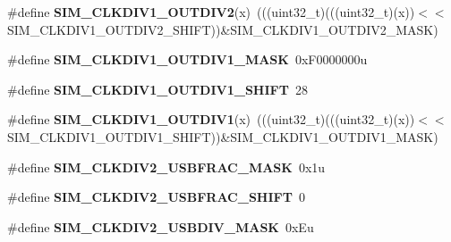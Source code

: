 \begin{DoxyCompactItemize}
\item 
\#define {\bfseries S\+I\+M\+\_\+\+C\+L\+K\+D\+I\+V1\+\_\+\+O\+U\+T\+D\+I\+V2}(x)~(((uint32\+\_\+t)(((uint32\+\_\+t)(x))$<$$<$S\+I\+M\+\_\+\+C\+L\+K\+D\+I\+V1\+\_\+\+O\+U\+T\+D\+I\+V2\+\_\+\+S\+H\+I\+FT))\&S\+I\+M\+\_\+\+C\+L\+K\+D\+I\+V1\+\_\+\+O\+U\+T\+D\+I\+V2\+\_\+\+M\+A\+SK)\hypertarget{group__SIM__Register__Masks_gacf3906094a4539818d91cfda55ae2141}{}\label{group__SIM__Register__Masks_gacf3906094a4539818d91cfda55ae2141}

\item 
\#define {\bfseries S\+I\+M\+\_\+\+C\+L\+K\+D\+I\+V1\+\_\+\+O\+U\+T\+D\+I\+V1\+\_\+\+M\+A\+SK}~0x\+F0000000u\hypertarget{group__SIM__Register__Masks_ga1bd42e75000e91999a7d8c2f94a9b606}{}\label{group__SIM__Register__Masks_ga1bd42e75000e91999a7d8c2f94a9b606}

\item 
\#define {\bfseries S\+I\+M\+\_\+\+C\+L\+K\+D\+I\+V1\+\_\+\+O\+U\+T\+D\+I\+V1\+\_\+\+S\+H\+I\+FT}~28\hypertarget{group__SIM__Register__Masks_ga2d45b701595bf4f2bc6a451508f94c25}{}\label{group__SIM__Register__Masks_ga2d45b701595bf4f2bc6a451508f94c25}

\item 
\#define {\bfseries S\+I\+M\+\_\+\+C\+L\+K\+D\+I\+V1\+\_\+\+O\+U\+T\+D\+I\+V1}(x)~(((uint32\+\_\+t)(((uint32\+\_\+t)(x))$<$$<$S\+I\+M\+\_\+\+C\+L\+K\+D\+I\+V1\+\_\+\+O\+U\+T\+D\+I\+V1\+\_\+\+S\+H\+I\+FT))\&S\+I\+M\+\_\+\+C\+L\+K\+D\+I\+V1\+\_\+\+O\+U\+T\+D\+I\+V1\+\_\+\+M\+A\+SK)\hypertarget{group__SIM__Register__Masks_ga288f4756a2240c6242f28335cc21a0a8}{}\label{group__SIM__Register__Masks_ga288f4756a2240c6242f28335cc21a0a8}

\item 
\#define {\bfseries S\+I\+M\+\_\+\+C\+L\+K\+D\+I\+V2\+\_\+\+U\+S\+B\+F\+R\+A\+C\+\_\+\+M\+A\+SK}~0x1u\hypertarget{group__SIM__Register__Masks_gab0c8e972a7c3831440784c5293a5d5f0}{}\label{group__SIM__Register__Masks_gab0c8e972a7c3831440784c5293a5d5f0}

\item 
\#define {\bfseries S\+I\+M\+\_\+\+C\+L\+K\+D\+I\+V2\+\_\+\+U\+S\+B\+F\+R\+A\+C\+\_\+\+S\+H\+I\+FT}~0\hypertarget{group__SIM__Register__Masks_ga01ab71acec84c43fdb78e81f7f8e554a}{}\label{group__SIM__Register__Masks_ga01ab71acec84c43fdb78e81f7f8e554a}

\item 
\#define {\bfseries S\+I\+M\+\_\+\+C\+L\+K\+D\+I\+V2\+\_\+\+U\+S\+B\+D\+I\+V\+\_\+\+M\+A\+SK}~0x\+Eu\hypertarget{group__SIM__Register__Masks_gaebed7d452e72dd54cb74783b61c64447}{}\label{group__SIM__Register__Masks_gaebed7d452e72dd54cb74783b61c64447}


\end{DoxyCompactItemize}
